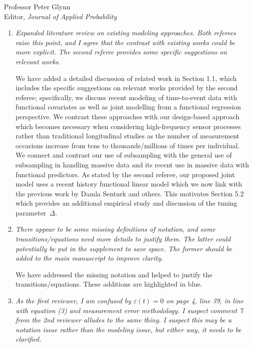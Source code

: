 \documentclass[11pt]{letter} %
\begin{document}
\begin{letter}{Professor
	Peter Glynn\\
	Editor, {\em Journal of Applied Probability}}
\begin{enumerate}
\item {\it Expanded literature review on existing modeling approaches. Both referees raise this point, and I agree that the contrast with existing works could be more explicit. The second referee provides some specific suggestions on relevant works.}

\vspace{5mm}
We have added a detailed discussion of related work in Section 1.1, which includes the specific suggestions on relevant works provided by the second referee; specifically, we discuss recent modeling of time-to-event data with functional covariates as well as joint modelling from a functional regression perspective.  We contrast these approaches with our design-based approach which becomes necessary when considering high-frequency sensor processes rather than traditional longitudinal studies as the number of measurement occasions increase from tens to thousands/millions of times per individual.  We connect and contrast our use of subsampling with the general use of subsampling in handling massive data and its recent use in massive data with functional predictors.  As stated by the second referee, our proposed joint model uses a recent history functional linear model which we now link with the previous work by Damla Senturk and others.  This motivates Section 5.2 which provides an additional empirical study and discussion of the tuning parameter~$\Delta$.
\vspace{5mm}

\item {\it There appear to be some missing definitions of notation, and some transitions/equations need more details to justify them. The latter could potentially be put in the supplement to save space. The former should be added to the main manuscript to improve clarity.}

\vspace{5mm}
We have addressed the missing notation and helped to justify the transitions/equations.  These additions are highlighted in blue.
\vspace{5mm}

\item {\it As the first reviewer, I am confused by $\varepsilon(t) = 0$ on page 4, line 39, in line with equation (3) and measurement error methodology. I suspect comment 7 from the 2nd reviewer alludes to the same thing. I suspect this may be a notation issue rather than the modeling issue, but either way, it needs to be clarified.}


\end{enumerate}
\end{letter}
\end{document}
